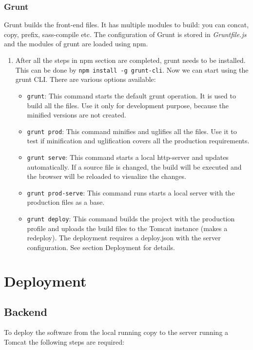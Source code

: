 \subsubsection{Grunt}
Grunt builds the front-end files. It has multiple modules to build: you can concat, copy, prefix, sass-compile etc. The configuration of Grunt is stored in \textit{Gruntfile.js} and the modules of grunt are loaded using npm.
\begin{enumerate}
  \item After all the steps in npm section are completed, grunt needs to be installed. This can be done by \texttt{npm install -g grunt-cli}. Now we can start using the grunt CLI. There are various options available:
  \begin{itemize}
      \item \texttt{grunt}: This command starts the default grunt operation. It is used to build all the files. Use it only for development purpose, because the minified versions are not created.
      \item \texttt{grunt prod}: This command minifies and uglifies all the files. Use it to test if minification and uglification covers all the production requirements.
      \item \texttt{grunt serve}: This command starts a local http-server and updates automatically. If a source file is changed, the build will be executed and the browser will be reloaded to visualize the changes.
      \item \texttt{grunt prod-serve}: This command runs starts a local server with the production files as a base.
      \item \texttt{grunt deploy}: This command builds the project with the production profile and uploads the build files to the Tomcat instance (makes a redeploy). The deployment requires a deploy.json with the server configuration. See section Deployment for details.
    \end{itemize}
\end{enumerate}

\section{Deployment}

\subsection{Backend}

To deploy the software from the local running copy to the server running a Tomcat the following steps are required:

